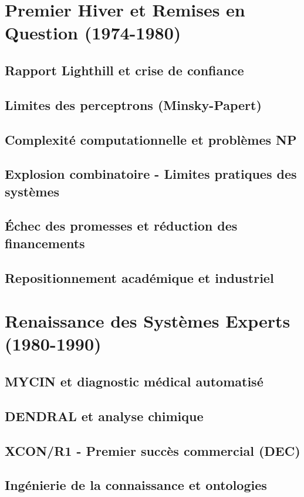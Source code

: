 \documentclass[12pt,a4paper]{book}
\begin{document}
\chapter{Premier Hiver et Remises en Question (1974-1980)}
\section{Rapport Lighthill et crise de confiance}
\section{Limites des perceptrons (Minsky-Papert)}
\section{Complexité computationnelle et problèmes NP}
\section{Explosion combinatoire - Limites pratiques des systèmes}
\section{Échec des promesses et réduction des financements}
\section{Repositionnement académique et industriel}

\chapter{Renaissance des Systèmes Experts (1980-1990)}
\section{MYCIN et diagnostic médical automatisé}
\section{DENDRAL et analyse chimique}
\section{XCON/R1 - Premier succès commercial (DEC)}
\section{Ingénierie de la connaissance et ontologies}
\end{document}
